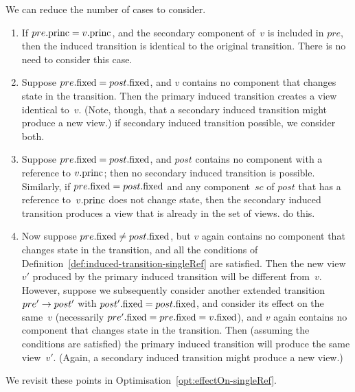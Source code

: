 \begin{opt}
\label{opt:induced-trans-singleRef}
We can reduce the number of cases to consider.
%
\begin{enumerate}
\item\label{case:opt-induced-trans-singleRef-1} If $pre.\mathrm{princ} = v.\mathrm{princ}$,
  and the secondary component of~$v$ is included in $pre$, then the induced
  transition is identical to the original transition.  There is no need to
  consider this case. 

\item\label{case:opt-induced-trans-singleRef-2} Suppose $pre.\mathrm{fixed} =
  post.\mathrm{fixed}$, and $v$ contains no component that changes state in the
  transition.  Then the primary induced transition creates a view identical
  to~$v$.  (Note, though, that a secondary induced transition might produce a
  new view.)   if secondary induced transition possible, we
  consider both.

\item\label{case:opt-induced-trans-singleRef-3} Suppose $pre.\mathrm{fixed} =
  post.\mathrm{fixed}$, and $post$ contains no component with a reference to
  $v.\mathrm{princ}$; then no secondary induced transition is possible.  Similarly, if
  $pre.\mathrm{fixed} = post.\mathrm{fixed}$ and any component~$sc$ of $post$ that has a
  reference to~$v.\mathrm{princ}$ does not change state, then the secondary induced
  transition produces a view that is already in the set of views. 
   do this.

\item\label{case:opt-induced-trans-singleRef-4} Now suppose $pre.\mathrm{fixed} \ne
  post.\mathrm{fixed}$, but $v$ again contains no component that changes state in the
  transition, and all the conditions of
  Definition~\ref{def:induced-transition-singleRef} are satisfied. Then the
  new view~$v'$ produced by the primary induced transition will be different
  from~$v$.  However, suppose we subsequently consider another extended
  transition $pre' \stackrel{}\rightarrow post'$ with $post'.\mathrm{fixed} = post.\mathrm{fixed}$, and
  consider its effect on the same~$v$ (necessarily $pre'.\mathrm{fixed} = pre.\mathrm{fixed} =
  v.\mathrm{fixed}$), and $v$ again contains no component that changes state in the
  transition.  Then (assuming the conditions are satisfied) the primary
  induced transition will produce the same view~$v'$.  (Again, a secondary
  induced transition might produce a new view.)  
\end{enumerate}
We revisit these points in Optimisation~\ref{opt:effectOn-singleRef}.
\end{opt}

